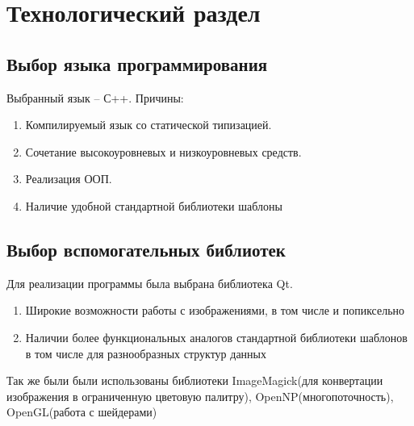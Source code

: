 \chapter{Технологический раздел}
\section{Выбор  языка программирования}
Выбранный язык – С++.
Причины:
\begin{enumerate}
	 \item Компилируемый язык со статической типизацией. 
	 \item Сочетание высокоуровневых и низкоуровневых средств.
	 \item Реализация ООП.
	 \item Наличие удобной стандартной библиотеки шаблоны
	 \end{enumerate}
\section{Выбор вспомогательных библиотек}
Для реализации программы была выбрана библиотека Qt.
\begin{enumerate}
	\item Широкие возможности работы с изображениями, в том числе и попиксельно
	\item Наличии более функциональных аналогов стандартной библиотеки шаблонов в том числе для разнообразных структур данных
\end{enumerate}
Так же были были использованы библиотеки ImageMagick(для конвертации изображения в ограниченную цветовую палитру), OpenNP(многопоточность), OpenGL(работа с шейдерами)
